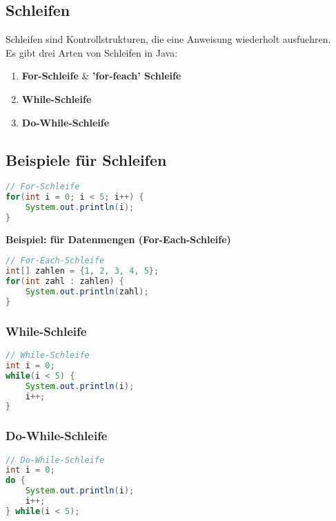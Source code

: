 \documentclass[12pt, a4paper]{article}
\begin{document}
\subsection*{Schleifen}
Schleifen sind Kontrollstrukturen, die eine Anweisung wiederholt ausfuehren. \\
Es gibt drei Arten von Schleifen in Java:
\begin{enumerate}
    \item \textbf{For-Schleife}
    \subsubitem \& \textbf{'for-feach' Schleife}
    \item \textbf{While-Schleife}
    \item \textbf{Do-While-Schleife}
\end{enumerate}
\subsection*{Beispiele für Schleifen}
\begin{lstlisting}[language=java,title=Beispiel:For-Schleife]
// For-Schleife
for(int i = 0; i < 5; i++) {
    System.out.println(i);
}
\end{lstlisting}

\textbf{Beispiel: für Datenmengen (For-Each-Schleife)}
\begin{lstlisting}[language=java,title=Beispiel:For-Each-Schleife]
// For-Each-Schleife
int[] zahlen = {1, 2, 3, 4, 5};
for(int zahl : zahlen) {
    System.out.println(zahl);
}
\end{lstlisting}
\newpage
\subsubsection*{While-Schleife}

\begin{lstlisting}[language=java,title=Beispiel:While-Schleife]
// While-Schleife
int i = 0;
while(i < 5) {
    System.out.println(i);
    i++;
}
\end{lstlisting}

\subsubsection*{Do-While-Schleife}

\begin{lstlisting}[language=java,title=Beispiel:Do-While-Schleife]
// Do-While-Schleife
int i = 0;
do {
    System.out.println(i);
    i++;
} while(i < 5);
\end{lstlisting}
\newpage
\end{document}
